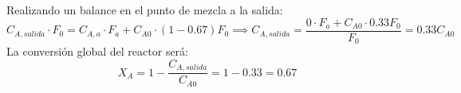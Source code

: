 \begin{enumerate}[label=\alph*)]
	      Realizando un balance en el punto de mezcla a la salida:
	      \begin{equation*}
		      C_{A,salida} \cdot F_0 = C_{A,a} \cdot F_a + C_{A0} \cdot (1-0.67) F_0 \implies C_{A,salida} = \frac{0 \cdot F_a + C_{A0} \cdot 0.33 F_0}{F_0} = 0.33 C_{A0}
	      \end{equation*}
	      La conversión global del reactor será:
	      \begin{equation*}
		      X_A = 1 - \frac{C_{A,salida}}{C_{A0}} = 1 - 0.33 = 0.67
	      \end{equation*}
	      \begin{center}
	      \end{center}
\end{enumerate}
